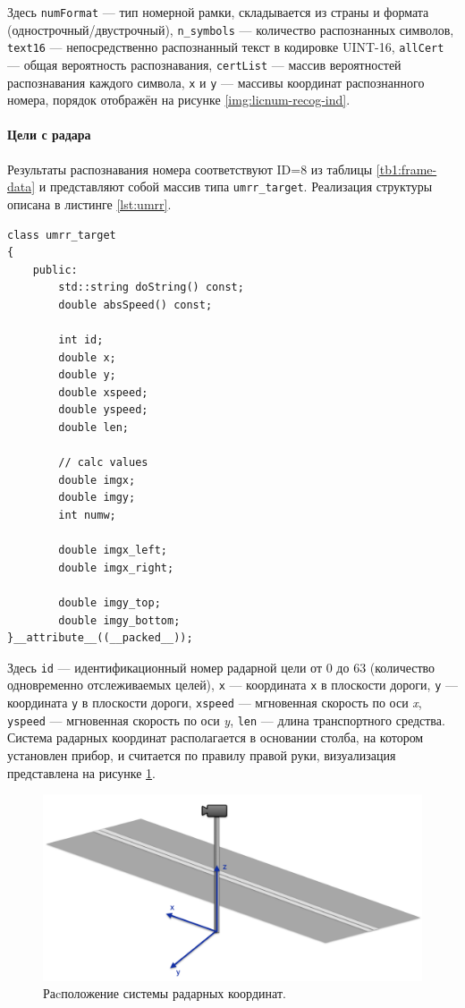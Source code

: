 \documentclass[specification,annotation,times]{itmo-student-thesis}
\begin{document}
Здесь \texttt{numFormat} --- тип номерной рамки, складывается из страны  и формата (однострочный/двустрочный), \texttt{n\_symbols} --- количество распознанных символов,  \texttt{text16} --- непосредственно распознанный текст в кодировке UINT-16,  \texttt{allCert} --- общая вероятность распознавания,  \texttt{certList} --- массив вероятностей распознавания каждого символа,  \texttt{x} и \texttt{y} --- массивы координат распознанного номера, порядок отображён на рисунке \ref{img:licnum-recog-ind}.


\paragraph{Цели с радара}
Результаты распознавания номера соответствуют ID=8 из таблицы \ref{tb1:frame-data} и представляют собой массив типа \texttt{umrr\_target}. Реализация структуры описана в листинге \ref{lst:umrr}.

\begin{lstlisting}[float=!h,caption={Реализация структуры \texttt{umrr\_target}.},label={lst:umrr}]
class umrr_target
{
	public:
		std::string doString() const;
		double absSpeed() const;
		
		int id;
		double x;
		double y;
		double xspeed;
		double yspeed;
		double len;
		
		// calc values
		double imgx;
		double imgy;
		int numw;
		
		double imgx_left;
		double imgx_right;
		
		double imgy_top;
		double imgy_bottom;
}__attribute__((__packed__));
\end{lstlisting}

Здесь \texttt{id} --- идентификационный номер радарной цели от 0 до 63 (количество одновременно отслеживаемых целей), \texttt{x} --- координата \texttt{x} в плоскости дороги, \texttt{y} --- координата \texttt{y} в плоскости дороги,  \texttt{xspeed} --- мгновенная скорость по оси \textit{x},  \texttt{yspeed} --- мгновенная скорость по оси \textit{y},  \texttt{len}  --- длина транспортного средства. Система радарных координат располагается в основании столба, на котором установлен прибор, и считается по правилу правой руки, визуализация представлена на рисунке \ref{img:road-coords}.

\begin{figure}[!ht]
	\caption{Раcположение системы радарных координат.}\label{img:road-coords}
	\includegraphics[width=0.85\linewidth]{../png/road_coords.png}
	\centering
\end{figure}
\end{document}
